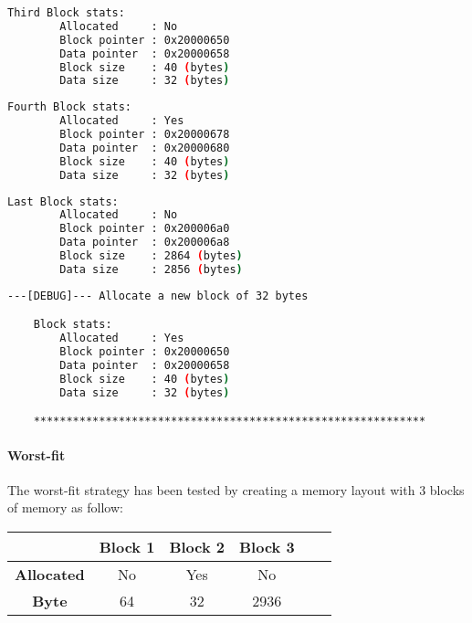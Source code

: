     \begin{outputbox}
    \begin{lstlisting}[language=bash]
    Third Block stats:
        Allocated     : No
        Block pointer : 0x20000650
        Data pointer  : 0x20000658
        Block size    : 40 (bytes)
        Data size     : 32 (bytes)
    \end{lstlisting}
    \end{outputbox}

    \begin{outputbox}
    \begin{lstlisting}[language=bash]
    Fourth Block stats:
        Allocated     : Yes
        Block pointer : 0x20000678
        Data pointer  : 0x20000680
        Block size    : 40 (bytes)
        Data size     : 32 (bytes)
    \end{lstlisting}
    \end{outputbox}

    \begin{outputbox}
    \begin{lstlisting}[language=bash]
    Last Block stats:
        Allocated     : No
        Block pointer : 0x200006a0
        Data pointer  : 0x200006a8
        Block size    : 2864 (bytes)
        Data size     : 2856 (bytes)
    \end{lstlisting}
    \end{outputbox}

    \begin{outputbox}
    \begin{lstlisting}[language=bash]
    ---[DEBUG]--- Allocate a new block of 32 bytes

    Block stats:
        Allocated     : Yes
        Block pointer : 0x20000650
        Data pointer  : 0x20000658
        Block size    : 40 (bytes)
        Data size     : 32 (bytes)

    ************************************************************
    \end{lstlisting}
    \end{outputbox}

    \paragraph{Worst-fit} The worst-fit strategy has been tested by creating a memory layout with 3 blocks of memory as follow:

    \begin{table}[h]
    \centering
    \begin{tabular}{|c|c|c|c|c|c|}
    \hline
    & \textbf{Block 1} & \textbf{Block 2} & \textbf{Block 3} \\
    \hline
    \textbf{Allocated} & No & Yes & No \\
    \textbf{Byte} & 64 & 32 & 2936 \\
    \hline
    \end{tabular}
    \end{table}

